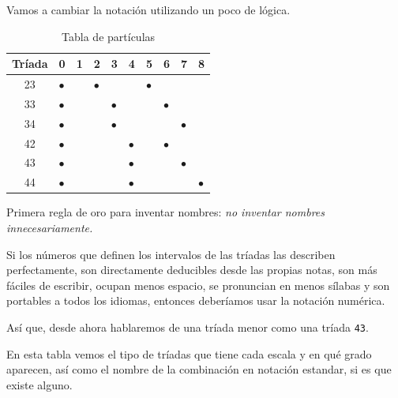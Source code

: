 \documentclass[]{report}
\begin{document}
Vamos a cambiar la notación utilizando un poco de lógica.

\begin{table}[ht]
	\centering
	\begin{tabularx}{\textwidth}{|c|X|X|X|X|X|X|X|X|X|}
		\hline
		Tríada & 0         & 1 & 2         & 3         & 4         & 5         & 6         & 7         & 8         \\
		\hline
		23     & $\bullet$ &   & $\bullet$ &           &           & $\bullet$ &           &           &           \\
		\hline
		33     & $\bullet$ &   &           & $\bullet$ &           &           & $\bullet$ &           &           \\
		\hline
		34     & $\bullet$ &   &           & $\bullet$ &           &           &           & $\bullet$ &           \\
		\hline
		42     & $\bullet$ &   &           &           & $\bullet$ &           & $\bullet$ &           &           \\
		\hline
		43     & $\bullet$ &   &           &           & $\bullet$ &           &           & $\bullet$ &           \\
		\hline
		44     & $\bullet$ &   &           &           & $\bullet$ &           &           &           & $\bullet$ \\
		\hline
	\end{tabularx}
	\caption{Tabla de partículas}\label{tab:particulas}
\end{table}



Primera regla de oro para inventar nombres: \emph{no inventar nombres   innecesariamente.}

Si los números que definen los intervalos de las tríadas las describen perfectamente, son directamente deducibles desde las propias notas, son más fáciles de escribir, ocupan menos espacio, se pronuncian en menos sílabas y son portables a todos los idiomas, entonces deberíamos usar la notación numérica.

Así que, desde ahora hablaremos de una tríada menor como una tríada \texttt{43}.

En esta tabla vemos el tipo de tríadas que tiene cada escala y en qué grado aparecen, así como el nombre de la combinación en notación estandar, si es que existe alguno.
\end{document}
